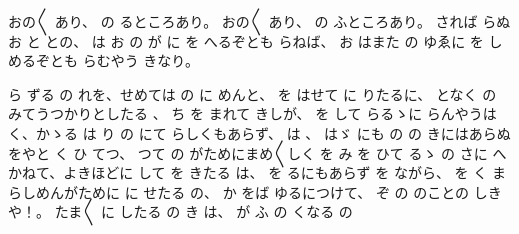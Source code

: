 
おの〳〵
あり、
の
るところあり。
おの〳〵
あり、
の
ふところあり。
されば
らぬ
お
と
との、
は
お
の
が
に
を
へるぞとも
らねば、
お
はまた
の
ゆゑに
を
しめるぞとも
らむやう
きなり。

ら
ずる
の
れを、せめては
の
に
めんと、
を
はせて
に
りたるに、
となく
の
みてうつかりとしたる
、
ち
を
まれて
きしが、
を
して
らるゝに
らんやうは
く、かゝる
は
り
の
にて
らしくもあらず、
は
、
はゞ
にも
の
の
きにはあらぬをやと
く
ひ
てつ、
つて
の
がためにまめ〳〵しく
を
み
を
ひて
るゝ
の
さに
へかねて、よきほどに
して
を
きたる
は、
を
るにもあらず
を
ながら、
を
く
まらしめんがために
に
せたる
の、
か
をば
ゆるにつけて、
ぞ
の
のことの
しきや！。
たま〳〵
に
したる
の
き
は、
が
ふ
の
くなる
の
